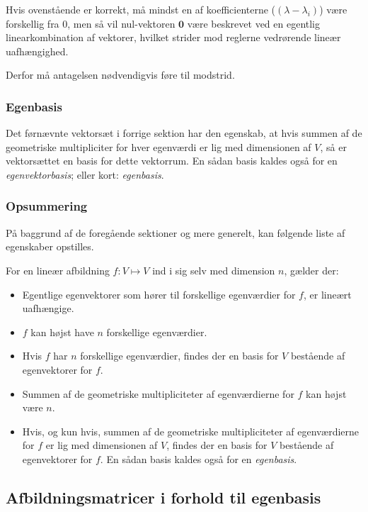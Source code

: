 \documentclass{article}
\begin{document}
	Hvis ovenstående er korrekt, må mindst en af koefficienterne ($(\lambda-\lambda_i)$) være forskellig fra 0, men så vil nul-vektoren $\textbf{0}$ være beskrevet ved en egentlig linearkombination af vektorer, hvilket strider mod reglerne vedrørende lineær uafhængighed.\newline
	
	Derfor må antagelsen nødvendigvis føre til modstrid.
	
	\subsubsection{Egenbasis}
	
	Det førnævnte vektorsæt i forrige sektion har den egenskab, at hvis summen af de geometriske multipliciter for hver egenværdi er lig med dimensionen af $V$, så er vektorsættet en basis for dette vektorrum. En sådan basis kaldes også for en \textit{egenvektorbasis}; eller kort: \textit{egenbasis}.
	
	\subsubsection{Opsummering}
	På baggrund af de foregående sektioner og mere generelt, kan følgende liste af egenskaber opstilles.\newline
	
	For en lineær afbildning $f : V \mapsto V$ ind i sig selv med dimension $n$, gælder der:
	\begin{itemize}
		\item Egentlige egenvektorer som hører til forskellige egenværdier for $f$, er lineært uafhængige.
		\item $f$ kan højst have $n$ forskellige egenværdier.
		\item Hvis $f$ har $n$ forskellige egenværdier, findes der en basis for $V$ bestående af egenvektorer for $f$.
		\item Summen af de geometriske multipliciteter af egenværdierne for $f$ kan højst være $n$.
		\item 	Hvis, og kun hvis, summen af de geometriske multipliciteter af egenværdierne for $f$ er lig med dimensionen af $V$, findes der en basis for $V$ bestående af egenvektorer for $f$. En sådan basis kaldes også for en \textit{egenbasis}.
	\end{itemize}
	\subsection{Afbildningsmatricer i forhold til egenbasis}
	
\end{document}
